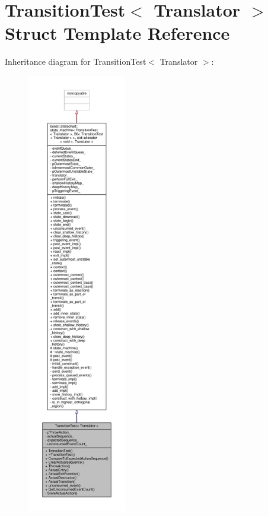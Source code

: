 \hypertarget{struct_transition_test}{}\section{Transition\+Test$<$ Translator $>$ Struct Template Reference}
\label{struct_transition_test}


Inheritance diagram for Transition\+Test$<$ Translator $>$\+:
\nopagebreak
\begin{figure}[H]
\begin{center}
\leavevmode
\includegraphics[height=550pt]{struct_transition_test__inherit__graph}
\end{center}
\end{figure}


